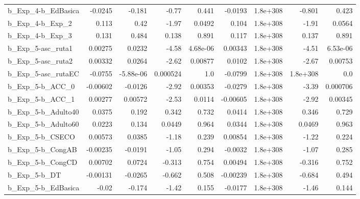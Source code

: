 \begin{tabular}{lrrrrrrrr}
b\_Exp\_4-b\_EdBasica           &     -0.0245 &       -0.181 &     -0.77 &    0.441 &    -0.0193 &    1.8e+308 &       -0.801 &         0.423 \\
b\_Exp\_4-b\_Exp\_2              &       0.113 &         0.42 &     -1.97 &   0.0492 &      0.104 &    1.8e+308 &        -1.91 &        0.0564 \\
b\_Exp\_4-b\_Exp\_3              &       0.131 &        0.484 &     0.138 &    0.891 &      0.117 &    1.8e+308 &        0.137 &         0.891 \\
b\_Exp\_5-asc\_ruta1            &     0.00275 &       0.0232 &     -4.58 & 4.68e-06 &    0.00343 &    1.8e+308 &        -4.51 &      6.53e-06 \\
b\_Exp\_5-asc\_ruta2            &     0.00332 &       0.0264 &     -2.62 &  0.00877 &     0.0102 &    1.8e+308 &        -2.67 &       0.00753 \\
b\_Exp\_5-asc\_rutaEC           &     -0.0755 &    -5.88e-06 &  0.000524 &      1.0 &    -0.0799 &    1.8e+308 &     1.8e+308 &           0.0 \\
b\_Exp\_5-b\_ACC\_0              &    -0.00602 &      -0.0126 &     -2.92 &  0.00353 &    -0.0279 &    1.8e+308 &        -3.39 &      0.000706 \\
b\_Exp\_5-b\_ACC\_1              &     0.00277 &      0.00572 &     -2.53 &   0.0114 &   -0.00605 &    1.8e+308 &        -2.92 &       0.00345 \\
b\_Exp\_5-b\_Adulto40           &      0.0375 &        0.192 &     0.342 &    0.732 &     0.0414 &    1.8e+308 &        0.346 &         0.729 \\
b\_Exp\_5-b\_Adulto60           &      0.0223 &        0.134 &    0.0449 &    0.964 &     0.0344 &    1.8e+308 &       0.0469 &         0.963 \\
b\_Exp\_5-b\_CSECO              &     0.00573 &       0.0385 &     -1.18 &    0.239 &    0.00854 &    1.8e+308 &        -1.22 &         0.224 \\
b\_Exp\_5-b\_CongAB             &    -0.00235 &      -0.0191 &     -1.05 &    0.294 &    -0.0032 &    1.8e+308 &        -1.07 &         0.285 \\
b\_Exp\_5-b\_CongCD             &     0.00702 &       0.0724 &    -0.313 &    0.754 &    0.00494 &    1.8e+308 &       -0.316 &         0.752 \\
b\_Exp\_5-b\_DT                 &    -0.00131 &      -0.0265 &    -0.662 &    0.508 &   -0.00239 &    1.8e+308 &       -0.684 &         0.494 \\
b\_Exp\_5-b\_EdBasica           &       -0.02 &       -0.174 &     -1.42 &    0.155 &    -0.0177 &    1.8e+308 &        -1.46 &         0.144 \\

\end{tabular}
